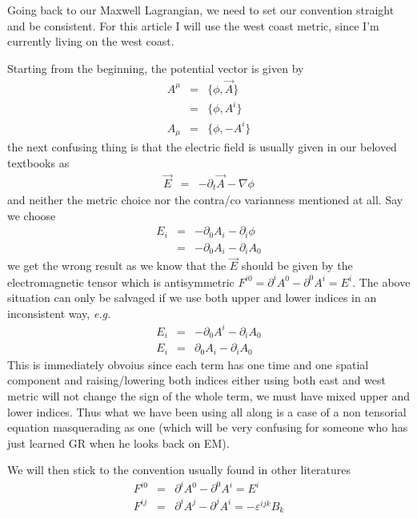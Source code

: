 \documentclass[aps,preprint,preprintnumbers,nofootinbib,showpacs,prd]{revtex4-1}
\newcommand{\eg}{{\it e.g.} }
\newcommand{\nbea}{\begin{eqnarray*}}
\newcommand{\neea}{\end{eqnarray*}}
\begin{document}
Going back to our Maxwell Lagrangian, we need to set our convention straight and be consistent. For this article I will use the west coast metric, since I'm currently living on the west coast.

Starting from the beginning, the potential vector is given by
%
\nbea
A^\mu & = & \{\phi, \vec A\} \\
& = & \{\phi, A^i\} \\
A_\mu & = & \{\phi, -A^i\}
\neea
%
the next confusing thing is that the electric field is usually given in our beloved textbooks as
%
\nbea
\vec E & = & -\partial_t \vec A - \nabla \phi
\neea
%
and neither the metric choice nor the contra/co varianness mentioned at all. Say we choose
%
\nbea
E_i & = & -\partial_0 A_i - \partial_i \phi \\
& = & -\partial_0 A_i - \partial_i A_0
\neea
%
we get the wrong result as we know that the $\vec E$ should be given by the electromagnetic tensor which is antisymmetric $F^{i0} = \partial^i A^0 - \partial^0 A^i = E^i$. The above situation can only be salvaged if we use both upper and lower indices in an inconsistent way, \eg
%
\nbea
E_i & = & -\partial_0 A^i - \partial_i A_0 \\
E_i & = & \partial_0 A_i - \partial_i A_0
\neea
%
This is immediately obvoius since each term has one time and one spatial component and raising/lowering both indices either using both east and west metric will not change the sign of the whole term, we must have mixed upper and lower indices. Thus what we have been using all along is a case of a non tensorial equation masquerading as one (which will be very confusing for someone who has just learned GR when he looks back on EM).

We will then stick to the convention usually found in other literatures
%
\nbea
F^{i0} & = & \partial^i A^0 - \partial^0 A^i = E^i \\
F^{ij} & = & \partial^i A^j - \partial^j A^i = -\varepsilon^{ijk} B_k
\neea
%
\end{document}
